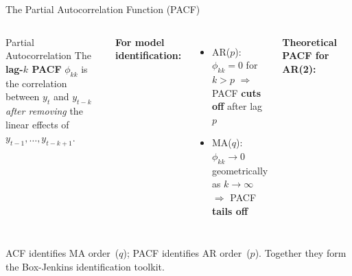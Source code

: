 \documentclass[aspectratio=169, 11pt]{beamer}
\begin{document}
\begin{frame}{The Partial Autocorrelation Function (PACF)}
  \begin{columns}[T]
      \begin{definitionbox}{Partial Autocorrelation}
        The \textbf{lag-$k$ PACF} $\phi_{kk}$ is the correlation between
        $y_t$ and $y_{t-k}$ \emph{after removing} the linear effects
        of $y_{t-1}, \ldots, y_{t-k+1}$.
      \end{definitionbox}
      \vspace{0.1cm}
      \textbf{For model identification:}
      \begin{itemize}\small
        \item AR($p$): $\phi_{kk} = 0$ for $k > p$
              $\Rightarrow$ PACF \textbf{cuts off} after lag $p$
        \item MA($q$): $\phi_{kk} \to 0$ geometrically as $k \to \infty$
              $\Rightarrow$ PACF \textbf{tails off}
      \end{itemize}
      \textbf{Theoretical PACF for AR(2):}
      \\[-3pt]
  \end{columns}
  \begin{keybox}
    {\small ACF identifies MA order~($q$); PACF identifies AR order~($p$).
    Together they form the Box-Jenkins identification toolkit.}
  \end{keybox}
\end{frame}
\end{document}
